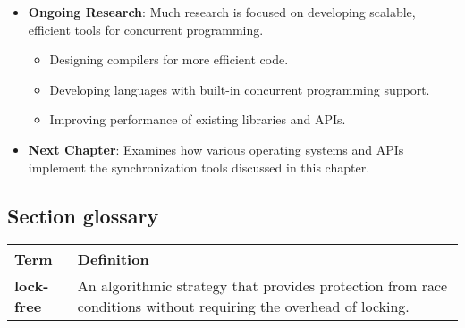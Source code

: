 \begin{itemize}
    \item \textbf{Ongoing Research}: Much research is focused on developing scalable, efficient tools for concurrent programming.
    \begin{itemize}
        \item Designing compilers for more efficient code.
        \item Developing languages with built-in concurrent programming support.
        \item Improving performance of existing libraries and APIs.
    \end{itemize}
    \item \textbf{Next Chapter}: Examines how various operating systems and APIs implement the synchronization tools discussed in this chapter.
\end{itemize}

\subsection*{Section glossary}
\centering
\begin{tabular}{>{\raggedright}p{} >{\raggedright\arraybackslash}p{}}
\toprule
\textbf{Term} & \textbf{Definition} \\
\midrule
\textbf{lock-free} & An algorithmic strategy that provides protection from race conditions without requiring the overhead of locking. \\
\bottomrule
\end{tabular}
\vspace{\baselineskip}
